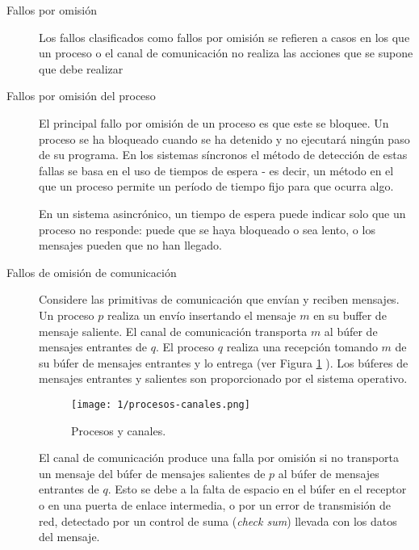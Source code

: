 \begin{description}
	\item[Fallos por omisión] Los fallos clasificados como fallos por omisión se refieren a casos en los que un  proceso o el canal de comunicación no realiza las acciones que se supone que debe realizar
	
	\item [Fallos por omisión del proceso] El principal fallo por omisión de un proceso es que este se bloquee. Un proceso se ha bloqueado cuando se ha detenido y no  ejecutará ning\'un paso de su programa. En los sistemas s\'incronos  el  método de detección de estas fallas se basa en el uso de
	tiempos de espera - es decir, un método en el que un proceso permite un período de tiempo fijo para que  ocurra algo. 
	
	
	En un sistema asincrónico, un tiempo de espera puede indicar solo que un proceso no responde: puede que se haya bloqueado o sea lento, o los mensajes pueden que no han llegado.
	
	\item 	[Fallos de omisión de comunicación] Considere las primitivas de comunicación que envían y reciben mensajes. Un proceso $p$ realiza un envío insertando el mensaje $m$ en su buffer de mensaje saliente. El canal de comunicación transporta $m$ al búfer de mensajes entrantes de $q$. El proceso $q$ realiza una recepción tomando $m$ de su búfer de mensajes entrantes y lo entrega (ver Figura \ref{fig:proc-canal} ). Los búferes de mensajes entrantes y salientes son  proporcionado por el sistema operativo.
	
	\begin{figure}%
		\texttt{[image: 1/procesos-canales.png]}
		\caption{Procesos y canales.}
		\label{fig:proc-canal}
	\end{figure}

	El canal de comunicación produce una falla por omisión si no transporta	un mensaje del búfer de mensajes salientes de $p$ al búfer de mensajes entrantes de $q$. Esto  se debe a la falta de espacio en el búfer en el receptor o en una puerta de enlace intermedia, o por un error de transmisión de red, detectado por un  control de suma (\textit{check sum}) llevada con los datos del mensaje. 



\end{description}
